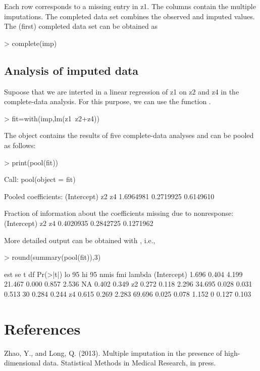\documentclass[a4paper]{article}
\begin{document}
Each row corresponds to a missing entry in z1. The columns contain the multiple imputations. The completed data set combines the observed and imputed values. The (first) completed data set can be obtained as
\begin{Schunk}
\begin{Sinput}
> complete(imp)
\end{Sinput}
\end{Schunk}

\subsection{Analysis of imputed data}
Supoose that we are interted in a linear regression of z1 on z2 and z4 in the complete-data analysis. For this purpose, we can use the function .
\begin{Schunk}
\begin{Sinput}
> fit=with(imp,lm(z1~z2+z4))
\end{Sinput}
\end{Schunk}
The  object contains the results of five complete-data analyses and can be pooled as follows:
\begin{Schunk}
\begin{Sinput}
> print(pool(fit))
\end{Sinput}
\begin{Soutput}
Call: pool(object = fit)

Pooled coefficients:
(Intercept)          z2          z4 
  1.6964981   0.2719925   0.6149610 

Fraction of information about the coefficients missing due to nonresponse: 
(Intercept)          z2          z4 
  0.4020935   0.2842725   0.1271962 
\end{Soutput}
\end{Schunk}
More detailed output can be obtained with , i.e.,
\begin{Schunk}
\begin{Sinput}
> round(summary(pool(fit)),3)
\end{Sinput}
\begin{Soutput}
              est    se     t     df Pr(>|t|) lo 95 hi 95 nmis   fmi lambda
(Intercept) 1.696 0.404 4.199 21.467    0.000 0.857 2.536   NA 0.402  0.349
z2          0.272 0.118 2.296 34.695    0.028 0.031 0.513   30 0.284  0.244
z4          0.615 0.269 2.283 69.696    0.025 0.078 1.152    0 0.127  0.103
\end{Soutput}
\end{Schunk}
























\section{References}

Zhao, Y., and Long, Q. (2013). Multiple imputation in the presence of high-dimensional data. Statistical Methods in Medical Research, in press.
\end{document}
